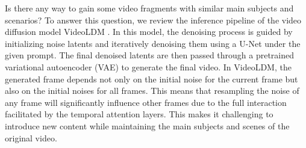 %

Is there any way to gain some video fragments with similar main subjects and scenarios? To answer this question, we review the inference pipeline of the video diffusion model VideoLDM \citep{blattmann2023align}. 
%
In this model, the denoising process is guided by initializing noise latents and iteratively denoising them using a U-Net\citep{ronneberger2015u} under the given prompt. The final denoised latents are then passed through a pretrained variational autoencoder (VAE) \citep{kingma2013auto} to generate the final video.
%
In VideoLDM\citep{blattmann2023align}, the generated frame depends not only on the initial noise for the current frame but also on the initial noises for all frames. This means that resampling the noise of any frame will significantly influence other frames due to the full interaction facilitated by the temporal attention layers. This makes it challenging to introduce new content while maintaining the main subjects and scenes of the original video.
%
\fi

